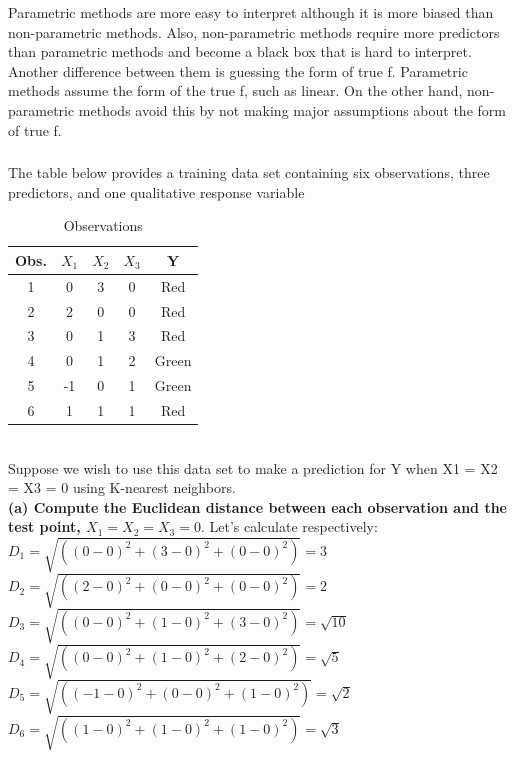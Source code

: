 \documentclass{article}
\begin{document}
Parametric methods are more easy to interpret although it is more biased than non-parametric methods. Also, non-parametric methods require more predictors than parametric methods and become a black box that is hard to interpret. Another difference between them is guessing the form of true f. Parametric methods assume the form of the true f, such as linear. On the other hand, non-parametric methods avoid this by not making major assumptions about the form of true f.


\subsubsection{} The table below provides a training data set containing six observations,
three predictors, and one qualitative response variable
\begin{table}[htbp]
  \centering
  \caption{Observations} 
  \label{tab:example}
  \begin{tabular}{|c|c|c|c|c|}
    \hline
    \textbf{Obs.} & \textbf{$X_1$} & \textbf{$X_2$} &\textbf{$X_3
    $} & \textbf{Y} \\
    \hline
    1 & 0 & 3 & 0 & Red \\
    \hline
    2 & 2 & 0 & 0 & Red \\
    \hline
    3 & 0 & 1 & 3 & Red\\
    \hline
    4 & 0 & 1 & 2 & Green\\
    \hline
    5 & -1 & 0 & 1 & Green \\
    \hline
    6 & 1 & 1 & 1 & Red\\
    \hline
  \end{tabular}
\end{table} \\
Suppose we wish to use this data set to make a prediction for Y when X1 = X2 = X3 = 0 using K-nearest neighbors.\\

\textbf{(a) Compute the Euclidean distance between each observation and the test point, $X_1 = X_2 = X_3 = 0.$ }
Let's calculate respectively: \\
$D_1 = \sqrt{((0-0)^2+(3-0)^2+(0-0)^2)} = 3$\\
$D_2 = \sqrt{((2-0)^2+(0-0)^2+(0-0)^2)} = 2$\\
$D_3 = \sqrt{((0-0)^2+(1-0)^2+(3-0)^2)} = \sqrt{10}$\\
$D_4 = \sqrt{((0-0)^2+(1-0)^2+(2-0)^2)} = \sqrt{5}$\\
$D_5 = \sqrt{((-1-0)^2+(0-0)^2+(1-0)^2)} = \sqrt{2}$\\
$D_6 = \sqrt{((1-0)^2+(1-0)^2+(1-0)^2)} = \sqrt{3}$\\
\end{document}
